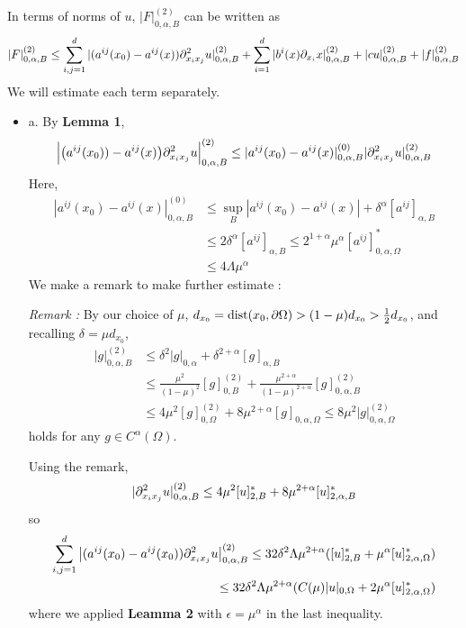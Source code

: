 \documentclass[12pt,a4paper]{article}
\newenvironment{proof}
{\begin{changemargin}{0.5cm}{0.5cm} 
	}%
	{\end{changemargin}
}
\renewenvironment{i}
{\begin{itemize} 
	}%
	{\end{itemize}
}
\newenvironment{p}
{\begin{proof} 
	}%
	{\end{proof}
}
\begin{document}
\begin{p}
In terms of norms of $u$, $|F|^{(2)}_{0, \alpha, B}$ can be written as
\begin{align*}
|F|^{(2)}_{0, \alpha, B} \leq \sum_{i,j=1}^d |(a^{ij}(x_0) - a^{ij}(x)) \partial^2_{x_i x_j} u|^{(2)}_{0, \alpha, B} + \sum_{i=1}^d |b^i(x) \partial_{x_i} x |^{(2)}_{0, \alpha, B} + |cu|^{(2)}_{0, \alpha, B} + |f|^{(2)}_{0, \alpha, B}
\end{align*}
We will estimate each term separately.

\begin{i} 
\item[a.] By \textbf{Lemma 1},
\begin{align*}
\Big|\big(a^{ij}(x_0)) - a^{ij}(x)\big)\partial^2_{x_i x_j}u \Big|^{(2)}_{0, \alpha, B} \leq |a^{ij}(x_0)- a^{ij}(x)|^{(0)}_{0, \alpha, B} |\partial^2_{x_i x_j} u|^{(2)}_{0, \alpha, B} 
\end{align*}
Here,
\begin{align*}
|a^{ij}(x_0) - a^{ij}(x)|^{(0)}_{0, \alpha, B} &\leq \sup_B |a^{ij}(x_0)-a^{ij}(x)| + {\delta}^{\alpha}[a^{ij}]_{\alpha, B} \\
& \leq 2\delta^{\alpha} [a^{ij}]_{\alpha, B} \leq 2^{1+\alpha} \mu^{\alpha} [a^{ij}]^{*}_{0, \alpha, \Omega} \\
& \leq 4\Lambda \mu^{\alpha}
\end{align*}
We make a remark to make further estimate :

\emph{Remark :} By our choice of $\mu$, $d_{x_0} = \text{dist}(x_0, \partial \Omega) > (1- \mu) d_{x_0} > \frac{1}{2} d_{x_0}$, and recalling $\delta = \mu d_{x_0}$, 
\begin{align*}
|g|^{(2)}_{0, \alpha, B} &\leq \delta^2 |g|_{0, \alpha} + \delta^{2+ \alpha} [g]_{\alpha, B} \\
&\leq \frac{\mu^2}{(1-\mu)^2} [g]^{(2)}_{0, B} + \frac{\mu^{2+ \alpha}}{(1- \mu)^{2+\alpha}} [g]^{(2)}_{0, \alpha, B} \\
&\leq 4\mu^2 [g]^{(2)}_{0, \Omega} + 8\mu^{2+\alpha}[g]_{0, \alpha,\Omega} \leq 8\mu^2 |g|^{(2)}_{0, \alpha, \Omega}
\end{align*}
holds for any $g\in C^{\alpha}(\Omega)$.

\quad Using the remark,
\begin{align*}
|\partial^2_{x_i x_j} u|^{(2)}_{0, \alpha, B} \leq 4\mu^2 [u]^*_{2, B} + 8\mu^{2+\alpha} [u]^*_{2, \alpha, B}
\end{align*}
so
\begin{align*}
\sum_{i,j=1}^d \big| (a^{ij}(x_0) - a^{ij}(x_0)) \partial^2_{x_i x_j}u \big|^{(2)}_{0, \alpha, B} \leq 32\delta^2 \Lambda \mu^{2+ \alpha} ([u]^*_{2, B} + \mu^{\alpha} [u]^*_{2, \alpha, \Omega}) \\
\leq 32\delta^2 \Lambda \mu^{2+\alpha} (C(\mu)|u|_{0, \Omega} + 2\mu^{\alpha}[u]^*_{2, \alpha, \Omega})
\end{align*}
where we applied \textbf{Leamma 2} with $\epsilon = \mu^{\alpha}$ in the last inequality.


\end{i}
\end{p}
\end{document}
